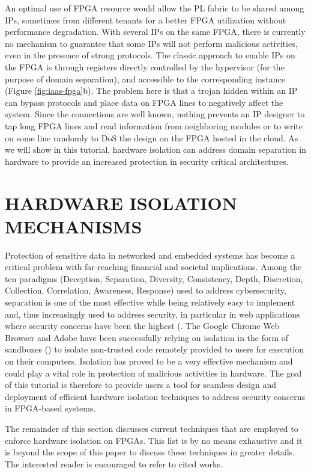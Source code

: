 \documentclass[sigconf]{acmart}
\theoremstyle{plain}
\theoremstyle{remark}
\begin{document}
An optimal use of FPGA resource would allow the PL fabric to be shared among IPs, sometimes from different tenants for a better FPGA utilization without performance degradation. With several IPs on the same FPGA, there is currently no mechanism to guarantee that some IPs will not perform malicious activities, even in the presence of strong protocols. The classic approach to enable IPs on the FPGA is through registers directly controlled by the hypervisor (for the purpose of domain separation), and accessible to the corresponding instance (Figure \ref{fig:iaas-fpga}b). The problem here is that a trojan hidden within an IP can bypass protocols and place data on FPGA lines to negatively affect the system. Since the connections are well known, nothing prevents an IP designer to tap long FPGA lines and read information from neighboring modules or to write on some line randomly to DoS the design on the FPGA hosted in the cloud. As we will show in this tutorial, hardware isolation can address domain separation in hardware to provide an increased protection in security critical architectures.

\section{HARDWARE ISOLATION MECHANISMS} \label{sec:problem_definition}

Protection of sensitive data in networked and embedded systems has become a critical problem with far-reaching financial and societal implications. Among the ten paradigms (Deception, Separation, Diversity,  Consistency, Depth, Discretion, Collection, Correlation, Awareness, Response) used to address cybersecurity, separation is one of the most effective while being relatively easy to implement and, thus increasingly used to address security, in particular in web applications where security concerns have been the highest (\cite{Mello2015,  JonesCU, Fireglass2016, Cottrell2017}. The Google Chrome Web Browser and Adobe have been successfully relying on isolation in the form of sandboxes (\cite{chromiumSB, adobeSB}) to isolate non-trusted code remotely provided to users for execution on their computers. Isolation has proved to be a very effective mechanism and could play a vital role in protection of malicious activities in hardware. The goal of this tutorial is therefore to provide users a tool for seamless design and deployment of efficient hardware isolation techniques to address security concerns in FPGA-based systems.

The remainder of this section discusses current techniques that are employed to enforce hardware isolation on FPGAs. This list is by no means exhaustive and it is beyond the scope of this paper to discuss these techniques in greater details. The interested reader is encouraged to refer to cited works.
\end{document}

